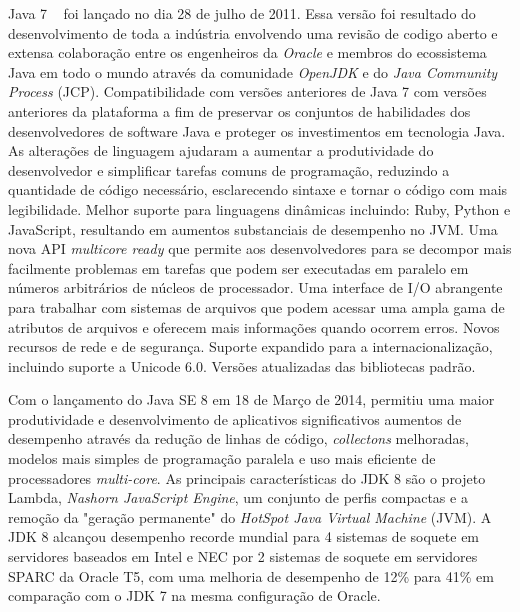 Java 7 ~\cite{JSE7} foi lançado no dia 28 de julho de 2011. Essa versão foi resultado do desenvolvimento de toda a indústria envolvendo uma revisão de codigo aberto e extensa colaboração entre os engenheiros da {\it Oracle} e membros do ecossistema Java em todo o mundo através da comunidade {\it OpenJDK} e do {\it Java Community Process} (\acs{JCP}). Compatibilidade com versões anteriores de Java 7 com versões anteriores da plataforma a fim de preservar os conjuntos de habilidades dos desenvolvedores de software Java e proteger os investimentos em tecnologia Java. As alterações de linguagem ajudaram a aumentar a produtividade do desenvolvedor e simplificar tarefas comuns de programação, reduzindo a quantidade de código necessário, esclarecendo sintaxe e tornar o código com mais legibilidade. Melhor suporte para linguagens dinâmicas incluindo: Ruby, Python e JavaScript, resultando em aumentos substanciais de desempenho no \acs{JVM}. Uma nova API {\it multicore ready} que permite aos desenvolvedores para se decompor mais facilmente problemas em tarefas que podem ser executadas em paralelo em números arbitrários de núcleos de processador. Uma interface de I/O abrangente para trabalhar com sistemas de arquivos que podem acessar uma ampla gama de atributos de arquivos e oferecem mais informações quando ocorrem erros. Novos recursos de rede e de segurança. Suporte expandido para a internacionalização, incluindo suporte a Unicode 6.0. Versões atualizadas das bibliotecas padrão.

Com o lançamento do Java SE 8 em 18 de Março de 2014, permitiu uma maior produtividade e desenvolvimento de aplicativos significativos aumentos de desempenho através da redução de linhas de código, {\it collectons} melhoradas, modelos mais simples de programação paralela e uso mais eficiente de processadores {\it multi-core}. As principais características do \acs{JDK} 8 são o projeto Lambda, {\it Nashorn JavaScript Engine}, um conjunto de perfis compactas e a remoção da "geração permanente" do {\it HotSpot Java Virtual Machine} (\acs{JVM}). A \acs{JDK} 8 alcançou desempenho recorde mundial para 4 sistemas de soquete em servidores baseados em Intel e NEC por 2 sistemas de soquete em servidores SPARC da Oracle T5, com uma melhoria de desempenho de 12\% para 41\% em comparação com o JDK 7 na mesma configuração de Oracle.


